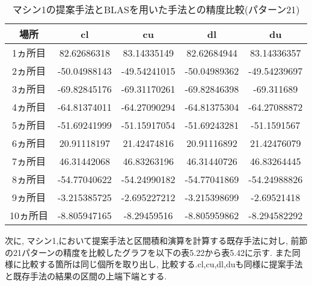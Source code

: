 \documentclass[11pt,a4paper]{jsreport}
\theoremstyle{definition}
\begin{document}
\begin{table}[H]
\centering
\begin{tabular}{|c|c|c|c|c|}
\hline
場所 & cl & cu & dl & du \\ \hline
1ヵ所目 & 82.62686318 & 83.14335149 & 82.62684944 & 83.14336357 \\ \hline
2ヵ所目 & -50.04988143 & -49.54241015 & -50.04989362 & -49.54239697 \\ \hline
3ヵ所目 & -69.82845176 & -69.31170261 & -69.82846398 & -69.311689 \\ \hline
4ヵ所目 & -64.81374011 & -64.27090294 & -64.81375304 & -64.27088872 \\ \hline
5ヵ所目 & -51.69241999 & -51.15917054 & -51.69243281 & -51.1591567 \\ \hline
6ヵ所目 & 20.91118197 & 21.42474816 & 20.91116892 & 21.42476079 \\ \hline
7ヵ所目 & 46.31442068 & 46.83263196 & 46.31440726 & 46.83264445 \\ \hline
8ヵ所目 & -54.77040622 & -54.24990182 & -54.77041869 & -54.24988826 \\ \hline
9ヵ所目 & -3.215385725 & -2.695227212 & -3.215398699 & -2.69521418 \\ \hline
10ヵ所目 & -8.805947165 & -8.29459516 & -8.805959862 & -8.294582292 \\ \hline
\end{tabular}
\caption{マシン1の提案手法とBLASを用いた手法との精度比較(パターン21)}
\end{table}


\indent 次に, マシン1,において提案手法と区間積和演算を計算する既存手法に対し, 前節の21パターンの精度を比較したグラフを以下の表5.22から表5.42に示す. また同様に比較する箇所は同じ個所を取り出し, 比較する.cl,cu,dl,duも同様に提案手法と既存手法の結果の区間の上端下端とする.
\end{document}
